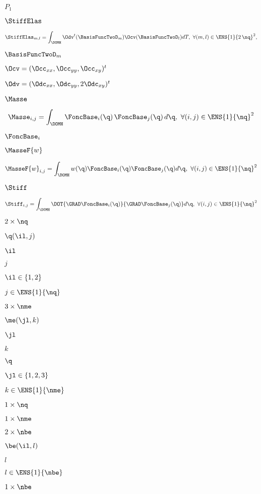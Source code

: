 \documentclass{article}
\begin{document}
$ P_1 $
\pagebreak

$ \StiffElas $
\pagebreak

\[ \StiffElas_{m,l}=\int_{\DOMH} \Odv^t(\BasisFuncTwoD_m) \Ocv(\BasisFuncTwoD_l)dT, \ \forall (m,l)\in\ENS{1}{2\,\nq}^2,\]
\pagebreak

$ \BasisFuncTwoD_m $
\pagebreak

$ \Ocv=(\Occ_{xx},\Occ_{yy},\Occ_{xy})^t $
\pagebreak

$ \Odv=(\Odc_{xx},\Odc_{yy},2\Odc_{xy})^t $
\pagebreak

$ \Masse $
\pagebreak

\[ \Masse_{i,j}=\int_\DOMH \FoncBase_i(\q)\, \FoncBase_j(\q)\, d\q,\ \forall (i,j)\in{\ENS{1}{\nq}}^2 \]
\pagebreak

$ \FoncBase_i $
\pagebreak

$ \MasseF{w} $
\pagebreak

\[ \MasseF{w}_{i,j}=\int_\DOMH w(\q)\FoncBase_i(\q) \FoncBase_j(\q) d\q,\ \forall (i,j)\in\ENS{1}{\nq}^2 \]
\pagebreak

$ \Stiff $
\pagebreak

\[ \Stiff_{i,j}=\int_\DOMH \DOT{\GRAD\FoncBase_i(\q)}{\GRAD\FoncBase_j(\q)}d\q,\ \forall (i,j)\in{\ENS{1}{\nq}}^2\]
\pagebreak

$2\times\nq$
\pagebreak

${\q}(\il,j)$
\pagebreak

$\il$
\pagebreak

$j$
\pagebreak

$\il\in\{1,2\}$
\pagebreak

$j\in\ENS{1}{\nq}$
\pagebreak

$3\times\nme$
\pagebreak

$\me(\jl,k)$
\pagebreak

$\jl$
\pagebreak

$k$
\pagebreak

$\q$
\pagebreak

$\jl\in\{1,2,3\}$
\pagebreak

$k\in{\ENS{1}{\nme}}$
\pagebreak

$1\times\nq$
\pagebreak

$1\times\nme$
\pagebreak

$2\times\nbe$
\pagebreak

$\be(\il,l)$
\pagebreak

$l$
\pagebreak

$l\in{\ENS{1}{\nbe}}$
\pagebreak

$1\times\nbe$
\pagebreak
\end{document}
